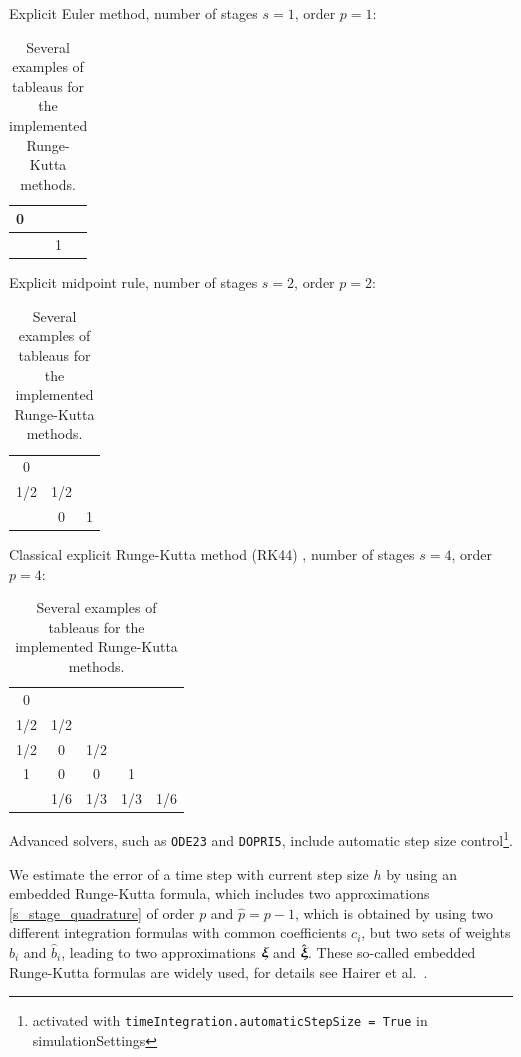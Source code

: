 \begin{table}
%
Explicit Euler method, number of stages $s=1$, order $p=1$:\\
\begin{center}
\begin{tabular}{p{0.1in}|p{0.1in}} %
0 & ~ \\ \hline 
~ & 1 \\ %
\end{tabular} \vspace{0.5cm}
\end{center}

Explicit midpoint rule, number of stages $s=2$, order $p=2$:\\
\begin{center}
\begin{tabular}{c|c c} %
0 &  &  \\ %
1/2 & 1/2 &  \\ \hline 
 & 0 & 1 \\ %
\end{tabular} \vspace{0.5cm}
\end{center}

Classical explicit Runge-Kutta method (RK44) , number of stages $s=4$, order $p=4$:\\
\begin{center}
\begin{tabular}{c|c c c c }
0 &  &  &  &  \\ %
1/2 & 1/2 &  &  &  \\ %
1/2 & 0 & 1/2 &  &  \\ %
1 & 0 & 0 & 1 &  \\ \hline 
 & 1/6 & 1/3 & 1/3 & 1/6 \\ %
\end{tabular}
\end{center}
%
\caption{Several examples of tableaus for the implemented Runge-Kutta methods.}
\label{tab:rungeKuttaTableaus}
\end{table}
%
%
Advanced solvers, such as \texttt{ODE23} and \texttt{DOPRI5}, include automatic step size control\footnote{activated with
\texttt{timeIntegration.automaticStepSize = True} in simulationSettings}.

We estimate the error of a time step with current step size $h$ by
using an embedded Runge-Kutta formula, which includes two approximations \ref{s_stage_quadrature} of order $p$ and $\hat p = p-1$, which is obtained by using two different integration formulas with common coefficients $c_i$, but two sets of weights $b_i$ and $\hat b_i$, leading to two approximations $\mbox{\boldmath $\xi$ \unboldmath}\!\!$ and $\hat {\mbox{\boldmath $\xi$ \unboldmath}\!\!}$. These so-called embedded Runge-Kutta formulas are widely used, for details see Hairer et al.\ \cite{Hairer1987}. 

